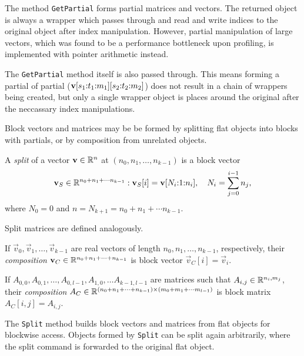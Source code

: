 The method \texttt{GetPartial} forms partial matrices and vectors. The
returned object is always a wrapper which passes through and read and
write indices to the original object after index
manipulation. However, partial manipulation of large vectors, which
was found to be a performance bottleneck upon profiling, is
implemented with pointer arithmetic instead.

The \texttt{GetPartial} method itself is also passed through. This
means forming a partial of partial
($\bm{\mathrm{v}}[s_1{:}t_1{:}m_1][s_2{:}t_2{:}m_2]$) does not
result in a chain of wrappers being created, but only a single wrapper
object is places around the original after the neccassary index
manipulations.

Block vectors and matrices may be be formed by splitting flat objects
into blocks with partials, or by composition from unrelated objects.

\begin{dfn}
  A \emph{split} of a vector $\bm{\mathrm{v}} \in \mathbb{R}^n$ at $(n_0, n_1,
  \ldots, n_{k - 1})$ is a block vector
  \begin{equation}
    \label{eq:operations:ds:vector-split}
    \bm{\mathrm{v}}_S \in \mathbb{R}^{n_0 + n_1 + \cdots n_{k - 1}} : \bm{\mathrm{v}}_S[i]
    = \bm{\mathrm{v}}[N_i{:}1{:}n_i], \quad N_i = \sum_{j = 0}^{i - 1} n_j \text,
  \end{equation}
  where $N_0 = 0$ and $n = N_{k + 1} = n_0 + n_1 + \cdots n_{k - 1}$.
\end{dfn}
Split matrices are defined analogously.

\begin{dfn}
  \label{dfn:operations:ds:vector-compose}
  If $\vec{v}_0, \vec{v}_1, \ldots, \vec{v}_{k - 1}$ are real vectors
  of length $n_0, n_1, \ldots, n_{k - 1}$, respectively, their
  \emph{composition}
  $\bm{\mathrm{v}}_C \in \mathbb{R}^{n_0 + n_1 + \cdots + n_{k - 1}}$ is block
  vector $\vec{v}_C[i] = \vec{v}_i$.
\end{dfn}

\begin{dfn}
  \label{dfn:operations:ds:matrix-compose}
  If
  $A_{0, 0}, A_{0, 1}, \ldots, A_{0, l - 1}, A_{1, 0}, \ldots A_{k - 1,
    l - 1}$
  are matrices such that $A_{i, j} \in \mathbb{R}^{n_i, m_j}$, their
  \emph{composition}
  $A_C \in \mathbb{R}^{(n_0 + n_1 + \cdots + n_{k - 1}) \times (m_0 +
    m_1 + \cdots m_{l - 1})}$ is block
  matrix $A_C[i, j] = A_{i, j}$.
\end{dfn}

The \texttt{Split} method builds block vectors and matrices from flat
objects for blockwise access. Objects formed by \texttt{Split} can be
split again arbitrarily, where the split command is forwarded to the
original flat object.

